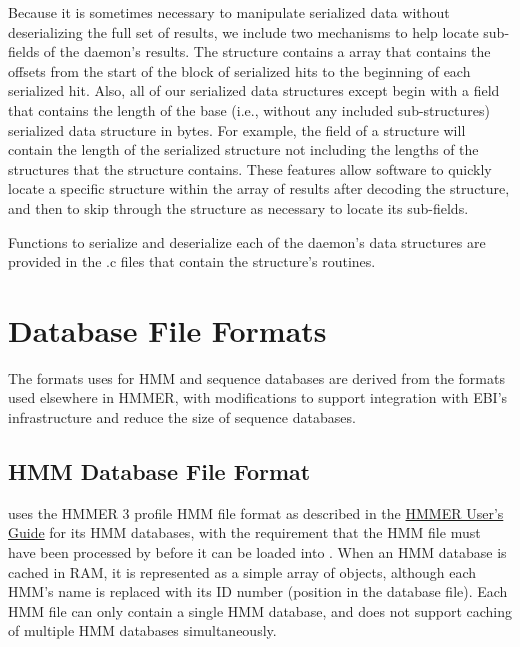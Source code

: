 \documentclass[notoc,justified]{tufte-book}    %
\begin{document}
{Because it is sometimes necessary to manipulate serialized data without deserializing the full set of results, we include two mechanisms to help locate sub-fields of the daemon's results.  The {} structure contains a  array that contains the offsets from the start of the block of serialized hits to the beginning of each serialized hit.  Also, all of our serialized data structures except {} begin with a  field that contains the length of the base (i.e., without any included sub-structures) serialized data structure in bytes.  For example, the  field of a {} structure will contain the length of the serialized {} structure not including the lengths of the {} structures that the {} structure contains.  These features allow software to quickly locate a specific {} structure within the array of results after decoding the {} structure, and then to skip through the {} structure as necessary to locate its sub-fields.

Functions to serialize and deserialize each of the daemon's data structures are provided in the .c files that contain the structure's routines.     

\chapter{Database File Formats}
The formats  uses for HMM and sequence databases are derived from the formats used elsewhere in HMMER, with modifications to support integration with EBI's infrastructure and reduce the size of sequence databases.

\section{HMM Database File Format}
 uses the HMMER 3 profile HMM file format as described in the \underline{HMMER User's Guide} for its HMM databases, with the requirement that the HMM file must have been processed by  before it can be loaded into .  When an HMM database is cached in RAM, it is represented as a simple array of  objects, although each HMM's name is replaced with its ID number (position in the database file).  Each HMM file can only contain a single HMM database, and  does not support caching of multiple HMM databases simultaneously.

}
\end{document}
